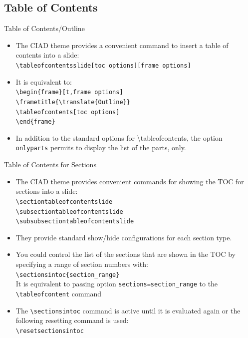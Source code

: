 \documentclass[english,sectioncirclenumberstyle]{ciadbeamer}
\begin{document}
\subsection{Table of Contents}

\begin{frame}{Table of Contents/Outline}
	\begin{itemize}
	\item The CIAD theme provides a convenient command to insert a table of contents into a slide: \\
		\texttt{{\textbackslash}tableofcontentsslide[toc options][frame options]}
	\vspace{1em}
	\item It is equivalent to: \\
		\texttt{{\textbackslash}begin\{frame\}[t,frame options]} \\
		\texttt{{\textbackslash}frametitle\{{\textbackslash}translate\{Outline\}\}} \\
		\texttt{{\textbackslash}tableofcontents[toc options]} \\
		\texttt{{\textbackslash}end\{frame\}}
	\vspace{1em}
	\item In addition to the standard options for {{\textbackslash}tableofcontents}, the option \texttt{onlyparts} permits to display the list of the parts, only.
	\end{itemize}
\end{frame}

\begin{frame}{Table of Contents for Sections}
	\begin{itemize}
	\item The CIAD theme provides convenient commands for showing the TOC for sections into a slide: \\
		\texttt{{\textbackslash}sectiontableofcontentslide} \\
		\texttt{{\textbackslash}subsectiontableofcontentslide} \\
		\texttt{{\textbackslash}subsubsectiontableofcontentslide}
	\item They provide standard show/hide configurations for each section type.
	\item You could control the list of the sections that are shown in the TOC by specifying a range of section numbers with: \\
		\texttt{{\textbackslash}sectionsintoc\{section\_range\}} \\
		It is equivalent to passing option \texttt{sections={section\_range}} to the \texttt{{\textbackslash}tableofcontent} command
	\item The \texttt{{\textbackslash}sectionsintoc} command is active until it is evaluated again or the following resetting command is used: \\
		\texttt{{\textbackslash}resetsectionsintoc}
	\end{itemize}
\end{frame}
\end{document}
